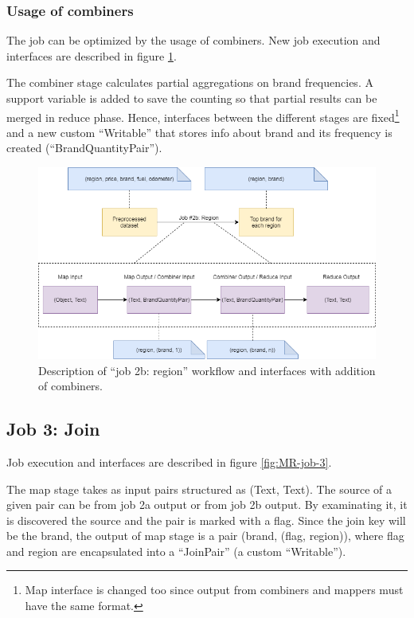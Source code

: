 \subsubsection{Usage of combiners}

The job can be optimized by the usage of combiners. New job execution and interfaces are described in figure \ref{fig:MR-job-2b-combiner}.

The combiner stage calculates partial aggregations on brand frequencies. A support variable is added to save the counting so that partial results can be merged in reduce phase. Hence, interfaces between the different stages are fixed\footnote{Map interface is changed too since output from combiners and mappers must have the same format.} and a new custom ``Writable'' that stores info about brand and its frequency is created (``BrandQuantityPair'').

\begin{figure}[H]
	\centering
	\includegraphics[scale=0.6]{images/2-mapreduce/MR-job-2b-combiner.png}
	\caption{Description of ``job 2b: region'' workflow and interfaces with addition of combiners.}
	\label{fig:MR-job-2b-combiner}
\end{figure} 

\subsection{Job 3: Join}

Job execution and interfaces are described in figure \ref{fig:MR-job-3}.

The map stage takes as input pairs structured as (Text, Text). The source of a given pair can be from job 2a output or from job 2b output. By examinating it, it is discovered the source and the pair is marked with a flag.
Since the join key will be the brand, the output of map stage is a pair (brand, (flag, region)), where flag and region are encapsulated into a ``JoinPair'' (a custom ``Writable'').

